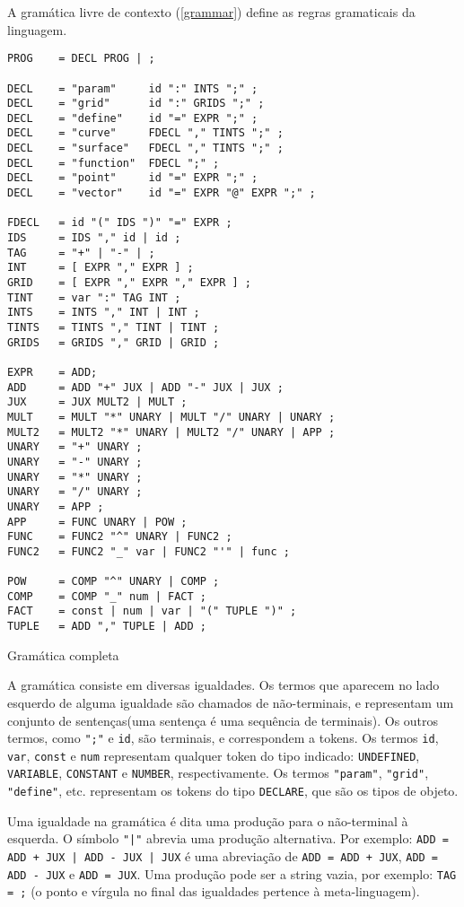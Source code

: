 \documentclass[10pt,a4paper]{article}
\newenvironment{code}{\captionsetup{type=listing}}{}
\begin{document}
A gramática livre de contexto (\ref{grammar}) define as regras gramaticais da linguagem.
\begin{code}
\begin{verbatim}
PROG    = DECL PROG | ;

DECL    = "param"     id ":" INTS ";" ;
DECL    = "grid"      id ":" GRIDS ";" ;
DECL    = "define"    id "=" EXPR ";" ;
DECL    = "curve"     FDECL "," TINTS ";" ;
DECL    = "surface"   FDECL "," TINTS ";" ;
DECL    = "function"  FDECL ";" ;
DECL    = "point"     id "=" EXPR ";" ;
DECL    = "vector"    id "=" EXPR "@" EXPR ";" ;

FDECL   = id "(" IDS ")" "=" EXPR ;
IDS     = IDS "," id | id ;
TAG     = "+" | "-" | ;
INT     = [ EXPR "," EXPR ] ;
GRID    = [ EXPR "," EXPR "," EXPR ] ;
TINT    = var ":" TAG INT ;
INTS    = INTS "," INT | INT ;
TINTS   = TINTS "," TINT | TINT ;
GRIDS   = GRIDS "," GRID | GRID ;

EXPR    = ADD;
ADD     = ADD "+" JUX | ADD "-" JUX | JUX ;
JUX     = JUX MULT2 | MULT ;
MULT    = MULT "*" UNARY | MULT "/" UNARY | UNARY ;
MULT2   = MULT2 "*" UNARY | MULT2 "/" UNARY | APP ;
UNARY   = "+" UNARY ;
UNARY   = "-" UNARY ;
UNARY   = "*" UNARY ;
UNARY   = "/" UNARY ;
UNARY   = APP ;
APP     = FUNC UNARY | POW ;
FUNC    = FUNC2 "^" UNARY | FUNC2 ;
FUNC2   = FUNC2 "_" var | FUNC2 "'" | func ;

POW     = COMP "^" UNARY | COMP ;
COMP    = COMP "_" num | FACT ;
FACT    = const | num | var | "(" TUPLE ")" ;
TUPLE   = ADD "," TUPLE | ADD ;
\end{verbatim}
\caption{Gramática completa}
\label{grammar}
\end{code}

A gramática consiste em diversas igualdades.
Os termos que aparecem no lado esquerdo de alguma igualdade são chamados de não-terminais,
e representam um conjunto de sentenças(uma sentença é uma sequência de terminais).
Os outros termos, como \texttt{";"} e \texttt{id}, são terminais,
e correspondem a tokens. Os termos \texttt{id}, \texttt{var}, \texttt{const}
e \texttt{num} representam qualquer token do tipo indicado:
\texttt{UNDEFINED}, \texttt{VARIABLE}, \texttt{CONSTANT} e \texttt{NUMBER}, respectivamente.
Os termos \texttt{"param"}, \texttt{"grid"}, \texttt{"define"}, etc.
representam os tokens do tipo \texttt{DECLARE}, que são os tipos de objeto.

Uma igualdade na gramática é dita uma produção para o não-terminal à esquerda.
O símbolo \texttt{"|"} abrevia uma produção alternativa.
Por exemplo: \texttt{ADD = ADD + JUX | ADD - JUX | JUX}
é uma abreviação de \texttt{ADD = ADD + JUX}, \texttt{ADD = ADD - JUX} e \texttt{ADD = JUX}.
Uma produção pode ser a string vazia, por exemplo: \texttt{TAG = ;}
(o ponto e vírgula no final das igualdades pertence à meta-linguagem).
\end{document}
